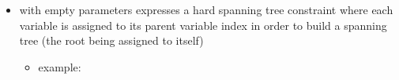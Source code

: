 \documentclass[letterpaper,10pt,openany,oneside,english]{sphinxmanual}
\begin{document}
\begin{itemize}
\begin{itemize}
\end{itemize}

\item {} 
\sphinxAtStartPar
{} with empty parameters expresses a hard spanning tree constraint where each variable is assigned to its parent variable index in order to build a spanning tree (the root being assigned to itself)
\begin{itemize}
\item {} 
\sphinxAtStartPar
example:

\begin{sphinxVerbatim}[commandchars=\\\{\}]
   \PYG{p}{[}   \PYG{p}{]}
           \PYG{p}{[}\PYG{p}{]}
\end{sphinxVerbatim}

\end{itemize}

\end{itemize}
\end{document}
